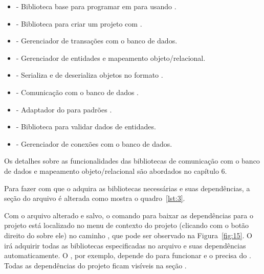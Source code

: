 \begin{itemize}
  \item {} - Biblioteca base para programar em  para  usando .
  \item {} - Biblioteca para criar um projeto  com .
  \item {} - Gerenciador de transações com o banco de dados.
  \item {} - Gerenciador de entidades e mapeamento objeto/relacional.
  \item {} - Serializa e de deserializa objetos  no formato .
  \item {} - Comunicação com o banco de dados .
  \item {} - Adaptador do  para padrões .
  \item {} - Biblioteca para validar dados de entidades.
  \item {} - Gerenciador de conexões com o banco de dados.
\end{itemize}

Os detalhes sobre as funcionalidades das bibliotecas de comunicação com o banco de dados e mapeamento objeto/relacional são abordados no capítulo 6. 

Para fazer com que o  adquira as bibliotecas necessárias e suas dependências, a seção  do arquivo  é alterada como mostra o quadro~\ref{lst:3}.


Com o arquivo  alterado e salvo, o comando para baixar as dependências para o projeto está localizado no menu de contexto do projeto (clicando com o botão direito do  sobre ele) no caminho , que pode ser observado na Figura~\ref{fig:15}. O  irá adquirir todas as bibliotecas especificadas no arquivo  e suas dependências automaticamente. O , por exemplo, depende do  para funcionar e o  precisa do . Todas as dependências do projeto ficam visíveis na seção .

